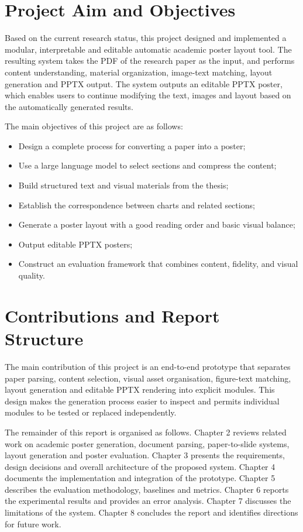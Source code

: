 \documentclass[12pt,oneside]{report}
\begin{document}
\section{Project Aim and Objectives}

Based on the current research status, this project designed and implemented a modular, interpretable and editable automatic academic poster layout tool. The resulting system takes the PDF of the research paper as the input, and performs content understanding, material organization, image-text matching, layout generation and PPTX output. The system outputs an editable PPTX poster, which enables users to continue modifying the text, images and layout based on the automatically generated results.

\vspace{1em}

The main objectives of this project are as follows:

\begin{itemize}
\item Design a complete process for converting a paper into a poster;
\item Use a large language model to select sections and compress the content;
\item Build structured text and visual materials from the thesis;
\item Establish the correspondence between charts and related sections;
\item Generate a poster layout with a good reading order and basic visual balance;
\item Output editable PPTX posters;
\item Construct an evaluation framework that combines content, fidelity, and visual quality.
\end{itemize}


\section{Contributions and Report Structure}

The main contribution of this project is an end-to-end prototype that separates paper parsing, content selection, visual asset organisation, figure-text matching, layout generation and editable PPTX rendering into explicit modules. This design makes the generation process easier to inspect and permits individual modules to be tested or replaced independently.\par
\vspace{1em}
The remainder of this report is organised as follows. Chapter 2 reviews related work on academic poster generation, document parsing, paper-to-slide systems, layout generation and poster evaluation. Chapter 3 presents the requirements, design decisions and overall architecture of the proposed system. Chapter 4 documents the implementation and integration of the prototype. Chapter 5 describes the evaluation methodology, baselines and metrics. Chapter 6 reports the experimental results and provides an error analysis. Chapter 7 discusses the limitations of the system. Chapter 8 concludes the report and identifies directions for future work.
\end{document}
